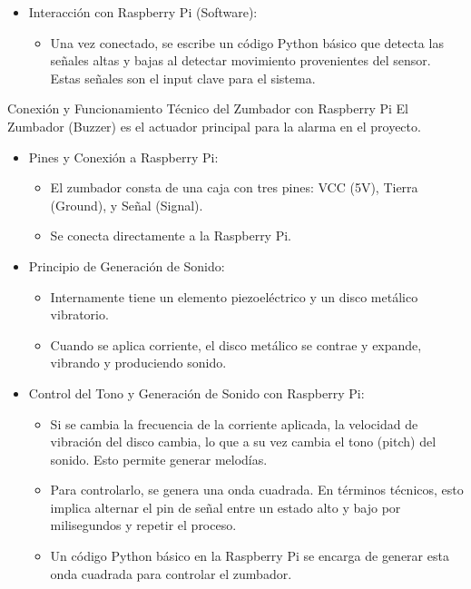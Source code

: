 \documentclass{report}
\begin{document}
\begin{itemize}
    \item Interacción con Raspberry Pi (Software):
    \begin{itemize}
        \item Una vez conectado, se escribe un código Python básico que detecta las señales altas y bajas al detectar movimiento provenientes 
        del sensor. Estas señales son el input clave para el sistema.
    \end{itemize}
\end{itemize}

Conexión y Funcionamiento Técnico del Zumbador con Raspberry Pi
El Zumbador (Buzzer) es el actuador principal para la alarma en el proyecto.
\begin{itemize}
    \item Pines y Conexión a Raspberry Pi:
    \begin{itemize}
        \item El zumbador consta de una caja con tres pines: VCC (5V), Tierra (Ground), y Señal (Signal).
        \item Se conecta directamente a la Raspberry Pi.
    \end{itemize}

    \item Principio de Generación de Sonido:
    \begin{itemize}
        \item Internamente tiene un elemento piezoeléctrico y un disco metálico vibratorio.
        \item Cuando se aplica corriente, el disco metálico se contrae y expande, vibrando y produciendo sonido.
    \end{itemize}

    \item Control del Tono y Generación de Sonido con Raspberry Pi:
    \begin{itemize}
        \item Si se cambia la frecuencia de la corriente aplicada, la velocidad de vibración del disco cambia, lo que a su vez cambia 
        el tono (pitch) del sonido. Esto permite generar melodías.
        \item Para controlarlo, se genera una onda cuadrada. En términos técnicos, esto implica alternar el pin de señal entre un estado 
        alto y bajo por milisegundos y repetir el proceso.
        \item Un código Python básico en la Raspberry Pi se encarga de generar esta onda cuadrada para controlar el zumbador.
    \end{itemize}

\end{itemize}
\end{document}
